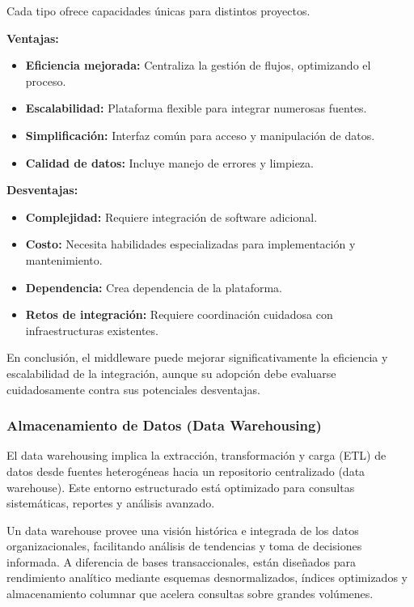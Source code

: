 \documentclass[12pt]{book}
\begin{document}
Cada tipo ofrece capacidades únicas para distintos proyectos.

\textbf{Ventajas:}

\begin{itemize}
    \item \textbf{Eficiencia mejorada:} Centraliza la gestión de flujos, optimizando el proceso.
    \item \textbf{Escalabilidad:} Plataforma flexible para integrar numerosas fuentes.
    \item \textbf{Simplificación:} Interfaz común para acceso y manipulación de datos.
    \item \textbf{Calidad de datos:} Incluye manejo de errores y limpieza.
\end{itemize}

\textbf{Desventajas:}

\begin{itemize}
    \item \textbf{Complejidad:} Requiere integración de software adicional.
    \item \textbf{Costo:} Necesita habilidades especializadas para implementación y mantenimiento.
    \item \textbf{Dependencia:} Crea dependencia de la plataforma.
    \item \textbf{Retos de integración:} Requiere coordinación cuidadosa con infraestructuras existentes.
\end{itemize}

En conclusión, el middleware puede mejorar significativamente la eficiencia y escalabilidad de la integración, aunque su adopción debe evaluarse cuidadosamente contra sus potenciales desventajas.

\subsubsection{Almacenamiento de Datos (Data Warehousing)}

El data warehousing implica la extracción, transformación y carga (ETL) de datos desde fuentes heterogéneas hacia un repositorio centralizado (data warehouse). Este entorno estructurado está optimizado para consultas sistemáticas, reportes y análisis avanzado.

Un data warehouse provee una visión histórica e integrada de los datos organizacionales, facilitando análisis de tendencias y toma de decisiones informada. A diferencia de bases transaccionales, están diseñados para rendimiento analítico mediante esquemas desnormalizados, índices optimizados y almacenamiento columnar que acelera consultas sobre grandes volúmenes.
\end{document}
